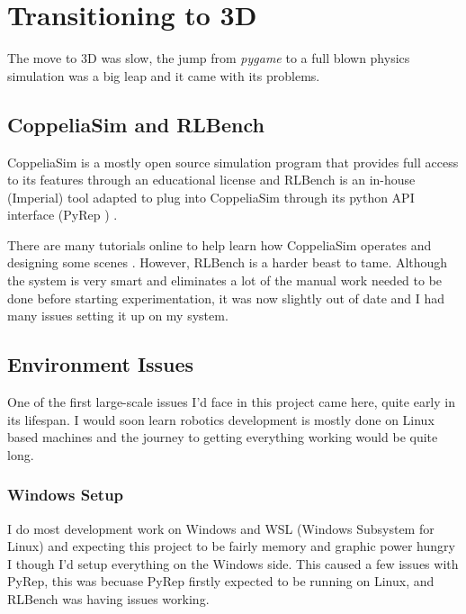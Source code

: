 \section{Transitioning to 3D}
The move to 3D was slow, the jump from \emph{pygame} to a full blown physics simulation was a big leap and it came with its problems.

\subsection{CoppeliaSim and RLBench}

CoppeliaSim is a mostly open source simulation program that provides full access to its features through an educational license and RLBench is an in-house (Imperial) tool adapted to plug into CoppeliaSim through its python API interface (PyRep \cite{}) . 

There are many tutorials online to help learn how CoppeliaSim operates and designing some scenes . However, RLBench is a harder beast to tame. Although the system is very smart and eliminates a lot of the manual work needed to be done before starting experimentation, it was now slightly out of date and I had many issues setting it up on my system.

\subsection{Environment Issues}
One of the first large-scale issues I'd face in this project came here, quite early in its lifespan. I would soon learn robotics development is mostly done on Linux based machines and the journey to getting everything working would be quite long.

\subsubsection{Windows Setup}
I do most development work on Windows and WSL (Windows Subsystem for Linux) \cite{} and expecting this project to be fairly memory and graphic power hungry I though I'd setup everything on the Windows side. This caused a few issues with PyRep, this was becuase PyRep firstly expected to be running on Linux, and RLBench was having issues working.


